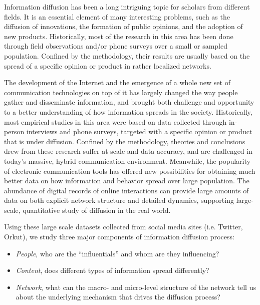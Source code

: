 \documentclass[phd,tocprelim]{cornell}
\begin{document}

Information diffusion has been a long intriguing topic for scholars from different fields. It is an essential element of many interesting problems, such as the diffusion of innovations\cite{rogers-2003}, the formation of public opinions\cite{katz_lazarsfeld,Watts-2007}, and the adoption of new products\cite{Bass:1969}. Historically, most of the research in this area has been done through field observations and/or phone surveys\cite{katz_57,rogers-2003} over a small or sampled population. Confined by the methodology, their results are usually based on the spread of a specific opinion or product in rather localized networks. 

The development of the Internet and the emergence of a whole new set of communication technologies on top of it has largely changed the way people  gather and disseminate information, and brought both challenge and opportunity to a better understanding of how information spreads in the society.
Historically, most empirical studies in this area were based on data collected through in-person interviews and phone surveys\cite{rogers-2003,katz_lazarsfeld}, targeted with a specific opinion or product that is under diffusion. Confined by the methodology, theories and conclusions drew from these research suffer at scale and data accuracy, and are challenged in today's massive, hybrid communication environment. Meanwhile, the popularity of electronic communication tools has offered new possibilities for obtaining much better data on how information and behavior spread over large population. The abundance of digital records of online interactions can provide large amounts of data on both explicit network structure and detailed dynamics, supporting large-scale, quantitative study of diffusion in the real world.

Using these large scale datasets collected from social media sites (i.e. Twitter, Orkut), we study three major components of information diffusion process:
\begin{itemize}
\item \emph{People}, who are the ``influentials'' and whom are they influencing?
\item \emph{Content}, does different types of information spread differently?
\item \emph{Network}, what can the macro- and micro-level structure of the network tell us about the underlying mechanism that drives the diffusion process?
\end{itemize}
\end{document}
